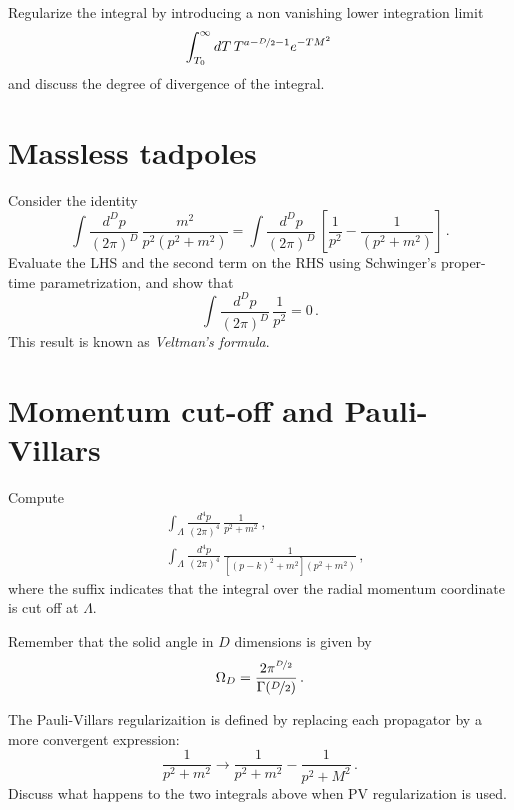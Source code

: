 \documentclass{tutorial}
\begin{document}
  Regularize the integral by introducing a non vanishing lower
  integration limit
  \[
    \int_{T_0}^\infty dT\, T^{a-\nicefrac{D}{2}-1} e^{-T M^2}\,
  \]
  and discuss the degree of divergence of the integral. 

\section{ Massless tadpoles}

  Consider the identity
  \[
    \int \frac{d^Dp}{(2\pi)^D}\, \frac{m^2}{p^2(p^2+m^2)} =
    \int \frac{d^Dp}{(2\pi)^D}\, \left[
      \frac{1}{p^2} - \frac{1}{(p^2+m^2)}
    \right]\, .
  \]
  Evaluate the LHS and the second term on the RHS using Schwinger's
  proper-time parametrization, and show that
  \[
    \int \frac{d^Dp}{(2\pi)^D}\, \frac{1}{p^2} = 0\, .
  \]
  This result is known as \emph{Veltman's formula}.

  

  \section{ Momentum cut-off and Pauli-Villars}

    Compute
    \begin{align*}
      &\int_\Lambda \frac{d^4p}{(2\pi)^4}\, \frac{1}{p^2+m^2}\, , \\
      &\int_\Lambda \frac{d^4p}{(2\pi)^4}\,
        \frac{1}{\left[(p-k)^2+m^2\right] \left(p^2+m^2\right)}\, ,
    \end{align*}
    where the suffix indicates that the integral over the radial
    momentum coordinate is cut off at $\Lambda$.

    Remember that the solid angle in $D$ dimensions is given by
    \[
      \Omega_D = \frac{2\pi^{\nicefrac{D}{2}}}{\Gamma(\nicefrac{D}{2})}\, .
    \]
   
    The Pauli-Villars regularizaition is defined by replacing each
    propagator by a more convergent expression:
    \[
      \frac{1}{p^2+m^2} \longrightarrow
      \frac{1}{p^2+m^2} - \frac{1}{p^2+M^2} \, .
    \]
    Discuss what happens to the two integrals above when PV
    regularization is used. 
    
\end{document}
